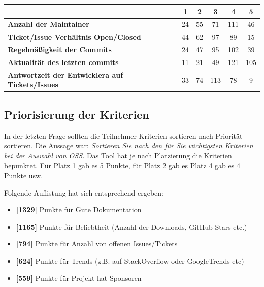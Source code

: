 \begin{table}[h]
    \begin{tabular}{l|c|c|c|c|c|}
                                                                & \textbf{1} & \textbf{2} & \textbf{3} & \textbf{4} & \textbf{5} \\ \hline
        \textbf{Anzahl der Maintainer}                          & 24         & 55         & 71         & 111        & 46         \\ \hline
        \textbf{Ticket/Issue Verhältnis Open/Closed}            & 44         & 62         & 97         & 89         & 15         \\ \hline
        \textbf{Regelmäßigkeit der Commits}                     & 24         & 47         & 95         & 102        & 39         \\ \hline
        \textbf{Aktualität des letzten commits}                 & 11         & 21         & 49         & 121        & 105        \\ \hline
        \textbf{Antwortzeit der Entwicklera auf Tickets/Issues} & 33         & 74         & 113        & 78         & 9          \\ \hline
    \end{tabular}%
\end{table}



\subsection*{Priorisierung der Kriterien}

In der letzten Frage sollten die Teilnehmer Kriterien sortieren nach Priorität sortieren. Die Aussage war:
\textit{Sortieren Sie nach den für Sie wichtigsten Kriterien bei der Auswahl von OSS.}
Das Tool hat je nach Platzierung die Kriterien bepunktet. Für Platz 1 gab es 5 Punkte, für Platz 2 gab es Platz 4 gab es 4 Punkte usw.

Folgende Auflistung hat sich entsprechend ergeben:

\begin{itemize}
    \item \textbf{[1329]} Punkte für Gute Dokumentation
    \item \textbf{[1165]} Punkte für Beliebtheit (Anzahl der Downloads, GitHub Stars etc.)
    \item \textbf{[794]} Punkte für Anzahl von offenen Issues/Tickets
    \item \textbf{[624]} Punkte für Trends (z.B. auf StackOverflow oder GoogleTrends etc)
    \item \textbf{[559]} Punkte für Projekt hat Sponsoren
\end{itemize}

